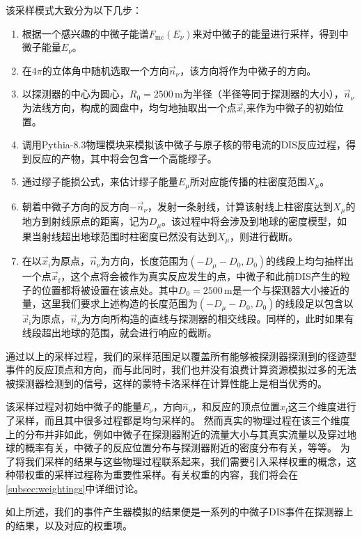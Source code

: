 该采样模式大致分为以下几步：
\begin{enumerate}
    \item 根据一个感兴趣的中微子能谱$F_\mathrm{mc}(E_\nu)$来对中微子的能量进行采样，得到中微子能量$E_\nu$。
    \item 在$4\pi$的立体角中随机选取一个方向$\vec{n}_\nu$，该方向将作为中微子的方向。
    \item 以探测器的中心为圆心，$R_0=2500\,\mathrm{m}$为半径（半径等同于探测器的大小），$\vec{n}_\nu$为法线方向，构成的圆盘中，均匀地抽取出一个点$\vec{x}_{i}$来作为中微子的初始位置。
    \item 调用\textsf{Pythia-8.3}物理模块来模拟该中微子与原子核的带电流的DIS反应过程，得到反应的产物，其中将会包含一个高能缪子。
    \item 通过缪子能损公式，来估计缪子能量$E_\mu$所对应能传播的柱密度范围$X_\mu$。
    \item 朝着中微子方向的反方向$-\vec{n}_\nu$，发射一条射线，计算该射线上柱密度达到$X_\mu$的地方到射线原点的距离，记为$D_\mu$。该过程中将会涉及到地球的密度模型，如果当射线超出地球范围时柱密度已然没有达到$X_\mu$，则进行截断。
    \item 在以$\vec{x}_\mathrm{i}$为原点，$\vec{n}_\nu$为方向，长度范围为$(-D_\mu-D_0, D_0)$的线段上均匀抽样出一个点$\vec{x}_\mathrm{f}$，这个点将会被作为真实反应发生的点，中微子和此前DIS产生的粒子的位置都将被设置在该点处。其中$D_0 = 2500\,\mathrm{m}$是一个与探测器大小接近的量，这里我们要求上述构造的长度范围为$(-D_\mu-D_0, D_0)$的线段足以包含以$\vec{x}_\mathrm{i}$为原点，$\vec{n}_\nu$为方向所构造的直线与探测器的相交线段。同样的，此时如果有线段超出地球的范围，就会进行响应的截断。
\end{enumerate}

通过以上的采样过程，我们的采样范围足以覆盖所有能够被探测器探测到的径迹型事件的反应顶点和方向，而与此同时，我们也并没有浪费计算资源模拟过多的无法被探测器检测到的信号，这样的蒙特卡洛采样在计算性能上是相当优秀的。

该采样过程对初始中微子的能量$E_\nu$，方向$\hat{n}_\nu$，和反应的顶点位置$x_\mathrm{f}$这三个维度进行了采样，而且其中很多过程都是均匀采样的。
然而真实的物理过程在该三个维度上的分布并非如此，例如中微子在探测器附近的流量大小与其真实流量以及穿过地球的概率有关，中微子的反应位置分布与探测器附近的密度分布有关，等等。
为了将我们采样的结果与这些物理过程联系起来，我们需要引入采样权重的概念，这种带权重的采样过程称为重要性采样。有关权重的内容，我们将会在\ref{subsec:weightings}中详细讨论。

如上所述，我们的事件产生器模拟的结果便是一系列的中微子DIS事件在探测器上的结果，以及对应的权重项。

